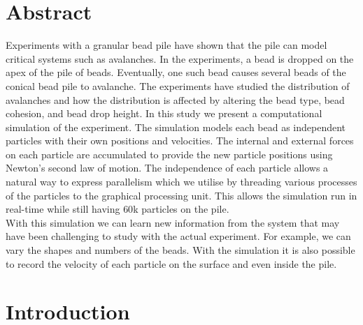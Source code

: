 \documentclass{book}
\begin{document}
\chapter*{Abstract}
\indent Experiments with a granular bead pile have shown that the pile can model critical systems such as avalanches. In the experiments, a bead is dropped on the apex of the pile of beads. Eventually, one such bead causes several beads of the conical bead pile to avalanche. The experiments have studied the distribution of avalanches and how the distribution is affected by altering the bead type, bead cohesion, and bead drop height. In this study we present a computational simulation of the experiment. The simulation models each bead as independent particles with their own positions and velocities. The internal and external forces on each particle are accumulated to provide the new particle positions using Newton's second law of motion. The independence of each particle allows a natural way to express parallelism which we utilise by threading various processes of the particles to the graphical processing unit. This allows the simulation run in real-time while still having $60$k particles on the pile.\\
\indent With this simulation we can learn new information from the system that may have been challenging to study with the actual experiment. For example, we can vary the shapes and numbers of the beads. With the simulation it is also possible to record the velocity of each particle on the surface and even inside the pile. 


\tableofcontents
\setcounter{tocdepth}{2}
\listoftables
\listoffigures

\mainmatter

\chapter{Introduction}\label{introduction}
\end{document}
